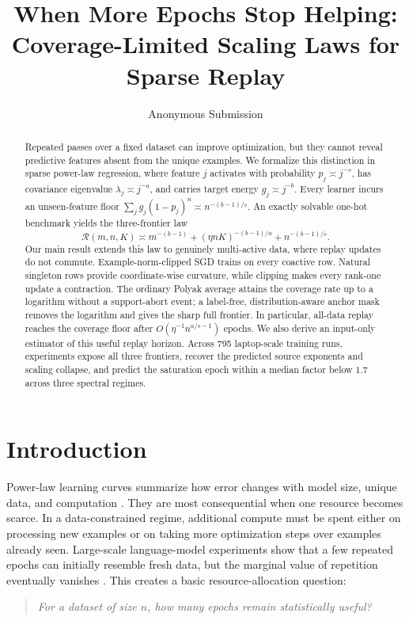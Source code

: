 \documentclass[letterpaper]{article}
\title{When More Epochs Stop Helping: Coverage-Limited Scaling Laws for Sparse Replay}
\author{Anonymous Submission}
\newcommand{\R}{\mathcal R}
\begin{document}
\maketitle

\begin{abstract}
Repeated passes over a fixed dataset can improve optimization, but they cannot
reveal predictive features absent from the unique examples. We formalize this
distinction in sparse power-law regression, where feature $j$ activates with
probability $p_j\asymp j^{-s}$, has covariance eigenvalue
$\lambda_j\asymp j^{-a}$, and carries target energy
$g_j\asymp j^{-b}$. Every learner incurs an unseen-feature floor
$\sum_j g_j(1-p_j)^n\asymp n^{-(b-1)/s}$. An exactly solvable one-hot
benchmark yields the three-frontier law
\[
\R(m,n,K)\asymp
m^{-(b-1)}+(\eta nK)^{-(b-1)/a}+n^{-(b-1)/s}.
\]
Our main result extends this law to genuinely multi-active data, where replay
updates do not commute. Example-norm-clipped SGD trains on every coactive row.
Natural singleton rows provide coordinate-wise curvature, while clipping makes
every rank-one update a contraction. The ordinary Polyak average attains the
coverage rate up to a logarithm without a support-abort event; a label-free,
distribution-aware anchor mask removes the logarithm and gives the sharp full
frontier. In particular, all-data replay reaches the coverage floor after
$O(\eta^{-1}n^{a/s-1})$ epochs. We also derive an input-only estimator of this
useful replay horizon. Across 795 laptop-scale training runs, experiments expose
all three frontiers, recover the predicted source exponents and scaling
collapse, and predict the saturation epoch within a median factor below $1.7$
across three spectral regimes.
\end{abstract}

\section{Introduction}

Power-law learning curves summarize how error changes with model size, unique
data, and computation \cite{hestness2017scaling,kaplan2020scaling,
hoffmann2022training,bahri2024explaining}. They are most consequential when
one resource becomes scarce. In a data-constrained regime, additional compute
must be spent either on processing new examples or on taking more optimization
steps over examples already seen. Large-scale language-model experiments show
that a few repeated epochs can initially resemble fresh data, but the marginal
value of repetition eventually vanishes \cite{muennighoff2025scaling}. This
creates a basic resource-allocation question:
\begin{quote}
\emph{For a dataset of size $n$, how many epochs remain statistically useful?}
\end{quote}
\end{document}
